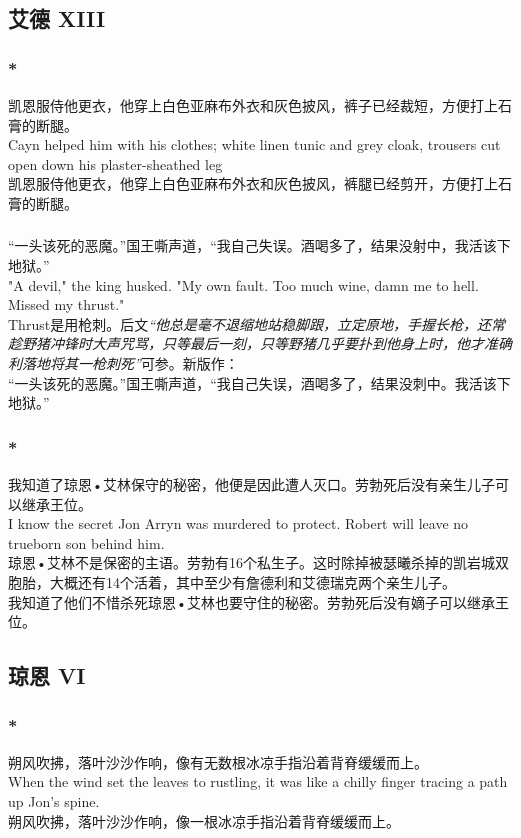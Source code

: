 \documentclass[12pt,a4paper]{article}
\newcommand{\h}[1]{{\color{red}#1}\\}
\newcommand{\la}[1]{{\color{blue}#1}\\}
\begin{document}
\subsection{艾德 XIII}
\subsubsection{\color{red}*}\la{
	凯恩服侍他更衣，他穿上白色亚麻布外衣和灰色披风，裤子已经裁短，方便打上石膏的断腿。\\
	Cayn helped him with his clothes; white linen tunic and grey cloak, trousers cut open down his plaster-sheathed leg}
	凯恩服侍他更衣，他穿上白色亚麻布外衣和灰色披风，裤腿已经剪开，方便打上石膏的断腿。

\subsubsection{}\la{
	“一头该死的恶魔。”国王嘶声道，“我自己失误。酒喝多了，结果没射中，我活该下地狱。”\\
	"A devil," the king husked. "My own fault. Too much wine, damn me to hell. Missed my thrust."}\h{
	Thrust是用枪刺。后文\emph{“他总是毫不退缩地站稳脚跟，立定原地，手握长枪，还常趁野猪冲锋时大声咒骂，只等最后一刻，只等野猪几乎要扑到他身上时，他才准确利落地将其一枪刺死”}可参。新版作：}
	“一头该死的恶魔。”国王嘶声道，“我自己失误，酒喝多了，结果没刺中。我活该下地狱。”
\subsubsection{\color{red}*}\la{
	我知道了琼恩•艾林保守的秘密，他便是因此遭人灭口。劳勃死后没有亲生儿子可以继承王位。\\
	I know the secret Jon Arryn was murdered to protect. Robert will leave no trueborn son behind him.}\h{
	琼恩•艾林不是保密的主语。劳勃有16个私生子。这时除掉被瑟曦杀掉的凯岩城双胞胎，大概还有14个活着，其中至少有詹德利和艾德瑞克两个亲生儿子。}
	我知道了他们不惜杀死琼恩•艾林也要守住的秘密。劳勃死后没有嫡子可以继承王位。
			
\subsection{琼恩 VI}
\subsubsection{\color{red}*}\la{
	朔风吹拂，落叶沙沙作响，像有无数根冰凉手指沿着背脊缓缓而上。\\
	When the wind set the leaves to rustling, it was like a chilly finger tracing a path up Jon's spine.}
	朔风吹拂，落叶沙沙作响，像一根冰凉手指沿着背脊缓缓而上。
\end{document}
